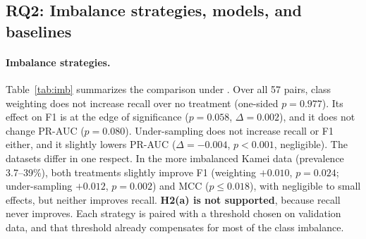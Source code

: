 
\subsection{RQ2: Imbalance strategies, models, and baselines}\label{sec:rq2}

\paragraph{Imbalance strategies.} Table~\ref{tab:imb} summarizes the comparison under \pthree. Over all 57 pairs, class weighting does not increase recall over no treatment (one-sided $p=0.977$). Its effect on F1 is at the edge of significance ($p=0.058$, $\Delta=0.002$), and it does not change PR-AUC ($p=0.080$). Under-sampling does not increase recall or F1 either, and it slightly lowers PR-AUC ($\Delta=-0.004$, $p<0.001$, negligible). The datasets differ in one respect. In the more imbalanced Kamei data (prevalence 3.7--39\%), both treatments slightly improve F1 (weighting $+0.010$, $p=0.024$; under-sampling $+0.012$, $p=0.002$) and MCC ($p\le0.018$), with negligible to small effects, but neither improves recall. \textbf{H2(a) is not supported}, because recall never improves. Each strategy is paired with a threshold chosen on validation data, and that threshold already compensates for most of the class imbalance.

